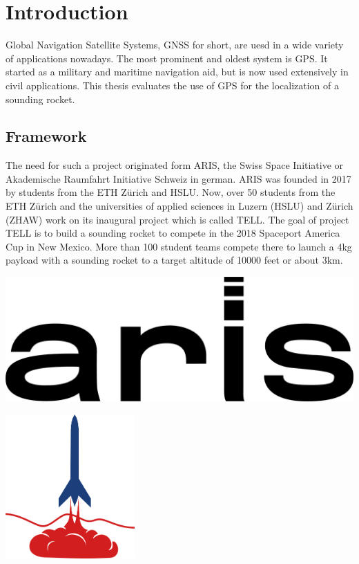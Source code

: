 \chapter{Introduction}

Global Navigation Satellite Systems, GNSS for short, are uesd in a wide variety of applications nowadays.
The most prominent and oldest system is GPS.
It started as a military and maritime navigation aid, but is now used extensively in civil applications.
This thesis evaluates the use of GPS for the localization of a sounding rocket.

\section{Framework}

The need for such a project originated form ARIS, the Swiss Space Initiative or Akademische Raumfahrt Initiative Schweiz in german.
ARIS was founded in 2017 by students from the ETH Z\"urich and HSLU.
Now, over 50 students from the ETH Z\"urich and the universities of applied sciences in Luzern (HSLU) and Z\"urich (ZHAW) work on its inaugural project which is called TELL.
The goal of project TELL is to build a sounding rocket to compete in the 2018 Spaceport America Cup in New Mexico.
More than 100 student teams compete there to launch a 4kg payload with a sounding rocket to a target altitude of 10000 feet or about 3km. \cite{aris}

\noindent
\begin{minipage}{0.5\textwidth}
 \centering
 \includegraphics[width=\textwidth]{images/ARIS.png}
\end{minipage}
\begin{minipage}{0.5\textwidth}
 \centering
 \includegraphics[height=5.5cm]{images/SAC_Logo.png}
\end{minipage}


